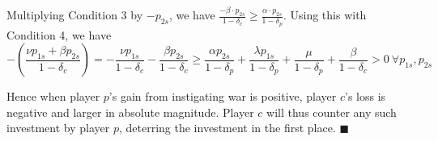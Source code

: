 \documentclass[12pt]{article}
\newcommand{\de}{\delta}
\begin{document}
Multiplying Condition 3 by $-p_{2s}$, we have $\frac{-\beta \cdot p_{2s}}{1-\de_c} \geq \frac{\alpha \cdot p_{2s}}{1-\de_p}$. Using this with Condition 4, we have
\[
  \textstyle -\left(\frac{\nu p_{1s} + \beta p_{2s}}{1 -\de_c}\right) = - \frac{\nu p_{1s}}{1 -\de_c} - \frac{\beta p_{2s}}{1 -\de_c} \geq \frac{\alpha p_{2s}}{1 -\de_p} +\frac{\lambda p_{1s}}{1 -\de_p} + \frac{\mu}{1-\de_p} + \frac{\beta}{1 - \de_c}> 0 \ \forall p_{1s},p_{2s}
\]

Hence when player $p$'s gain from instigating war is positive, player $c$'s loss is negative and larger in absolute magnitude. Player $c$ will thus counter any such investment by player $p$, deterring the investment in the first place. \hfill $\blacksquare$
\\
\end{document}
